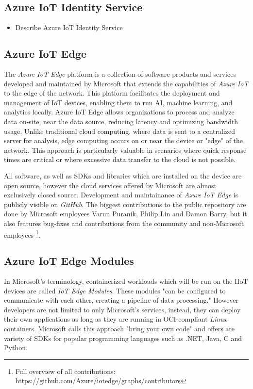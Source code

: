 \subsection{Azure IoT Identity Service}
\begin{tcolorbox}[title=TODO]
    \begin{itemize}
        \item Describe Azure IoT Identity Service
    \end{itemize}
\end{tcolorbox}

\subsection{Azure IoT Edge}
The \textit{Azure IoT Edge} platform is a collection of software products and
services developed and maintained by Microsoft that extends the capabilities
of \textit{Azure IoT} to the edge of the network. This platform facilitates the
deployment and management of \ac{IoT} devices, enabling them to run \ac{AI},
machine learning, and analytics locally. Azure IoT Edge allows organizations to
process and analyze data on-site, near the data source, reducing latency and
optimizing bandwidth usage.
Unlike traditional cloud computing, where data is sent to a centralized server
for analysis, edge computing occurs on or near the device or "edge" of the
network. This approach is particularly valuable in scenarios where quick
response times are critical or where excessive data transfer to the cloud
is not possible\cite{msdoc-aziotedge}.

All software, as well as \ac{SDK}s and
libraries which are installed on the device are open source, however the
cloud services offered by Microsoft are almost exclusively closed source.
Development and maintainance of \textit{Azure IoT Edge} is publicly visible on
\textit{GitHub}. The biggest contributions
to the public repository are done by Microsoft employees Varun Puranik,
Philip Lin and Damon Barry, but it also features bug-fixes and contributions
from the community and non-Microsoft employees
\footnote{Full overview of all contributions: https://github.com/Azure/iotedge/graphs/contributors}.

\subsection{Azure IoT Edge Modules}
In Microsoft's terminology, containerized workloads which will be run on the \ac{IIoT}
devices are called \textit{IoT Edge Modules}. These modules "can be configured to
communicate with each other, creating a pipeline of data processing." However developers are
not limited to only Microsoft's services, instead, they can deploy their own
applications as long as they are running in \ac{OCI}-compliant \textit{Linux} containers.
Microsoft calls this approach "bring your own code" and offers are variety of
\ac{SDK}s for popular programming languages such as .NET, Java, C and Python\cite{msdoc-supportetplatforms}.

